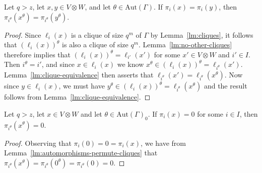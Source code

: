 \documentclass[ALCO, Unicode]{cedram}
\newcommand{\Aut}{\mathrm{Aut}}
\begin{document}
\begin{lemma} \label{lm:automorphisms-permute-cliques}
Let $q > z$, let $x, y \in V \otimes W$, and let $\theta \in \Aut{\left(\Gamma \right)}$. If $\pi_i{\left(x \right)} = \pi_i{\left(y \right)}$, then $\pi_{i^\theta}{\left(x^\theta \right)} = \pi_{i^\theta}{\left(y^\theta \right)}$.
\end{lemma}
\begin{proof}
Since $\ell_i{\left(x \right)}$ is a clique of size $q^m$ of $\Gamma$ by Lemma~\ref{lm:cliques}, it follows that $\left(\ell_i{\left(x \right)}\right)^\theta$ is also a clique of size $q^m$. Lemma~\ref{lm:no-other-cliques} therefore implies that $\left(\ell_i{\left(x \right)}\right)^\theta = \ell_{i'}{\left(x' \right)}$ for some $x' \in V \otimes W$ and $i' \in I$. Then $i^\theta = i'$, and since $x \in \ell_i{\left(x \right)}$ we know $x^\theta \in \left(\ell_i{\left(x \right)}\right)^\theta = \ell_{i^\theta}{\left(x' \right)}$. Lemma~\ref{lm:clique-equivalence} then asserts that $\ell_{i^\theta}{\left(x' \right)} = \ell_{i^\theta}{\left(x^\theta \right)}$. Now since $y \in \ell_i{\left(x \right)}$, we must have $y^\theta \in \left(\ell_i{\left(x \right)}\right)^\theta = \ell_{i^\theta}{\left(x^\theta \right)}$ and the result follows from Lemma~\ref{lm:clique-equivalence}.
\end{proof}

\begin{lemma} \label{lm:image-of-projection-to-zero}
Let $q > z$, let $x \in V \otimes W$ and let $\theta \in \Aut{\left(\Gamma \right)}_0$. If $\pi_i{\left(x \right)} = 0$ for some $i \in I$, then $\pi_{i^\theta}{\left(x^\theta \right)} = 0$.
\end{lemma}
\begin{proof}
Observing that $\pi_i{\left(0 \right)} = 0 = \pi_i{\left(x \right)}$, we have from Lemma~\ref{lm:automorphisms-permute-cliques} that $\pi_{i^\theta}{\left(x^\theta \right)} = \pi_{i^\theta}{\left(0^\theta \right)} = \pi_{i^\theta}{\left(0 \right)} = 0$.
\end{proof}
\end{document}
